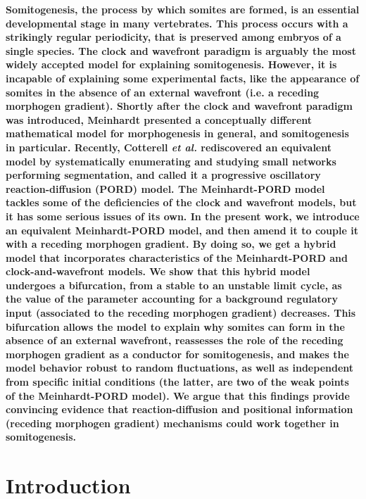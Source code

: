 \documentclass[%
 preprint,
 aip, 
 amsmath,amssymb,
]{revtex4-2}
\begin{document}
\maketitle

\textbf{
Somitogenesis, the process by which somites are formed, is an essential developmental stage in many vertebrates. This process occurs with a strikingly regular periodicity, that is preserved among embryos of a single species. The clock and wavefront paradigm is arguably the most widely accepted model for explaining somitogenesis. However, it is incapable of explaining some experimental facts, like the appearance of somites in the absence of an external wavefront (i.e. a receding morphogen gradient). Shortly after the clock and wavefront paradigm was introduced, Meinhardt presented a conceptually different mathematical model for morphogenesis in general, and somitogenesis in particular. Recently, Cotterell \emph{et al.} rediscovered an equivalent model by systematically enumerating and studying small networks performing segmentation, and called it a progressive oscillatory reaction-diffusion (PORD) model. The Meinhardt-PORD model tackles some of the deficiencies of the clock and wavefront models, but it has some serious issues of its own. In the present work, we introduce an equivalent Meinhardt-PORD model, and then amend it to couple it with a receding morphogen gradient. By doing so, we get a hybrid model that incorporates characteristics of the Meinhardt-PORD and clock-and-wavefront models. We show that this hybrid model undergoes a bifurcation, from a stable to an unstable limit cycle, as the value of the parameter accounting for a background regulatory input (associated to the receding morphogen gradient) decreases. This bifurcation allows the model to explain why somites can form in the absence of an external wavefront, reassesses the role of the receding morphogen gradient as a conductor for somitogenesis, and makes the model behavior robust to random fluctuations, as  well as independent from specific initial conditions (the latter, are two of the weak points of the Meinhardt-PORD model). We argue that this findings provide convincing evidence that reaction-diffusion and positional information (receding morphogen gradient) mechanisms could work together in somitogenesis.	
}

\section{Introduction}
\label{intro}
\end{document}
